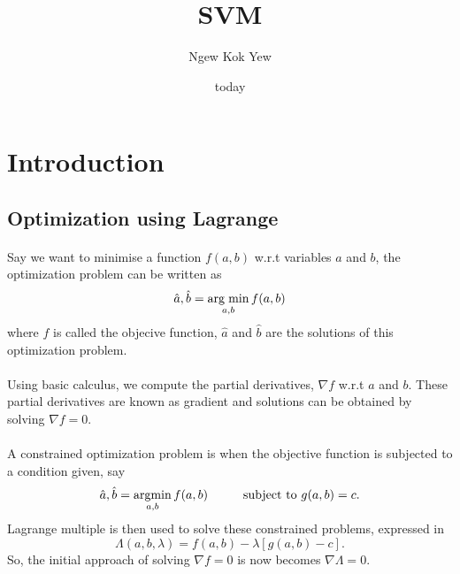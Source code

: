 \documentclass{article}
\title{SVM}
\author{Ngew Kok Yew}
\date{today}
\begin{document}
\maketitle
{}
\newpage
{}
\section{Introduction}
\subsection{Optimization using Lagrange}
\paragraph{}
Say we want to minimise a function $f(a, b)$ w.r.t variables $a$ and $b$, the optimization problem can be written as 
\begin{equation*}
    \hat{a}, \hat{b} = \operatorname*{arg \hspace{1mm} min}_{a, b} f(a,b)
\end{equation*}
where $f$ is called the objecive function, $\hat{a}$ and $\hat{b}$ are the solutions of this optimization problem.

\paragraph{}
Using basic calculus, we compute the partial derivatives, $\nabla f$ w.r.t $a$ and $b$. These partial derivatives are known as gradient and solutions can be obtained by solving $\nabla f = 0$.

\paragraph{}
A constrained optimization problem is when the objective function is subjected to a condition given, say
\begin{equation*}
    \hat{a}, \hat{b} = \operatorname*{arg min}_{a, b} f(a,b) \hspace{10mm} \text{subject to } g(a, b) = c.    
\end{equation*}
Lagrange multiple is then used to solve these constrained problems, expressed in
\begin{equation*}
    \Lambda (a, b, \lambda) = f(a, b) - \lambda[g(a, b) -c].
\end{equation*}
So, the initial approach of solving $\nabla f = 0$ is now becomes $\nabla \Lambda = 0$.
\end{document}
